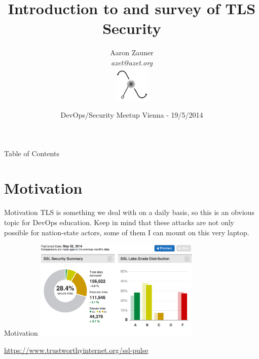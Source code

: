 \documentclass[hyperref={draft}]{beamer}
\title{Introduction to and survey of TLS Security}
\author[Aaron Zauner]{Aaron Zauner\\
	      \textit{azet@azet.org}\\
	      \includegraphics[height=65px,width=65px]{lambda}
       }
\institute{lambda.co.at:\\Highly-Available, Scalable \& Secure Distributed Systems}
\date{DevOps/Security Meetup Vienna - 19/5/2014}
\begin{document}
{

\begin{frame}
  \titlepage
\end{frame}

}
\addtocounter{framenumber}{-1}

{

\begin{frame}{Table of Contents}
  \tableofcontents
\end{frame}

}
\addtocounter{framenumber}{-1}




\section{Motivation}

\begin{frame}{Motivation}
  TLS is something we deal with on a daily basis, so this is an obvious topic for DevOps education.
  \newline
  \newline
  Keep in mind that these attacks are not only possible for nation-state actors, some of them I can mount on this very laptop.
\end{frame}

\begin{frame}{Motivation}
    \includegraphics[height=180px]{sslpulse}

    \vspace{10px}

    \tiny
    \url{https://www.trustworthyinternet.org/ssl-pulse}
\end{frame}
\end{document}
